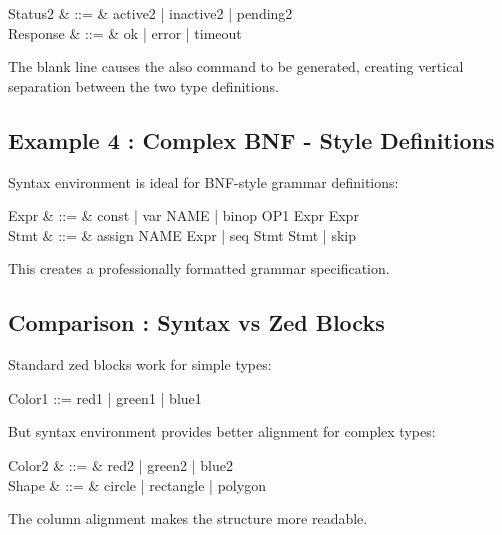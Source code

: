 \documentclass[a4paper,10pt,fleqn]{article}
\begin{document}
\bigskip

\begin{syntax}
Status2 & ::= & active2 | inactive2 | pending2 \\
Response & ::= & ok | error \ldata \nat \rdata | timeout
\end{syntax}

\noindent The blank line causes the also command to be generated, creating vertical separation between the two type definitions.

\bigskip

\subsection*{Example 4 : Complex BNF - Style Definitions}

\noindent Syntax environment is ideal for BNF-style grammar definitions:

\bigskip

\begin{syntax}
Expr & ::= & const \ldata \nat \rdata | var \ldata NAME \rdata | binop \ldata OP1 \cross Expr \cross Expr \rdata \\
Stmt & ::= & assign \ldata NAME \cross Expr \rdata | seq \ldata Stmt \cross Stmt \rdata | skip
\end{syntax}

\noindent This creates a professionally formatted grammar specification.

\bigskip

\subsection*{Comparison : Syntax vs Zed Blocks}

\noindent Standard zed blocks work for simple types:

\bigskip

\begin{zed}
Color1 ::= red1 | green1 | blue1
\end{zed}

\noindent But syntax environment provides better alignment for complex types:

\bigskip

\begin{syntax}
Color2 & ::= & red2 | green2 | blue2 \\
Shape & ::= & circle \ldata \nat \rdata | rectangle \ldata \nat \cross \nat \rdata | polygon \ldata \seq~\nat \rdata
\end{syntax}

\noindent The column alignment makes the structure more readable.

\bigskip
\end{document}
